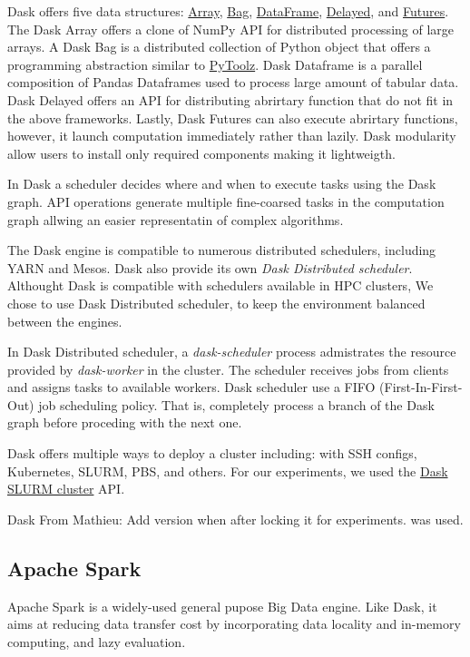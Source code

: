\documentclass[conference]{IEEEtran}
\newcommand{\MD}[1]{\color{magenta}From Mathieu: #1 \color{black}}
\begin{document}
Dask offers five data structures:
\href{https://docs.dask.org/en/latest/array.html}{Array},
\href{https://docs.dask.org/en/latest/bag.html}{Bag},
\href{https://docs.dask.org/en/latest/dataframe.html}{DataFrame},
\href{https://docs.dask.org/en/latest/delayed.html}{Delayed},
and \href{https://docs.dask.org/en/latest/futures.html}{Futures}.
The Dask Array offers a clone of NumPy API for distributed processing of large arrays.
A Dask Bag is a distributed collection of Python object that offers a programming abstraction similar to \href{https://toolz.readthedocs.io/en/latest/}{PyToolz}.
Dask Dataframe is a parallel composition of Pandas Dataframes used to process large amount of tabular data.
Dask Delayed offers an API for distributing abrirtary function that do not fit in the above frameworks.
Lastly, Dask Futures can also execute abrirtary functions, however, it launch computation immediately rather than lazily.
Dask modularity allow users to install only required components making it lightweigth.

In Dask a scheduler decides where and when to execute tasks using the Dask graph.
API operations generate multiple fine-coarsed tasks in the computation graph allwing an easier representatin of complex algorithms.

The Dask engine is compatible to numerous distributed schedulers, including YARN and Mesos.
Dask also provide its own \textit{Dask Distributed scheduler}.
Althought Dask is compatible with schedulers available in HPC clusters,
We chose to use Dask Distributed scheduler, to keep the environment balanced between the engines.

In Dask Distributed scheduler, a \textit{dask-scheduler} process admistrates the resource provided by \textit{dask-worker} in the cluster.
The scheduler receives jobs from clients and assigns tasks to available workers.
Dask scheduler use a FIFO (First-In-First-Out) job scheduling policy.
That is, completely process a branch of the Dask graph before proceding with the next one.

Dask offers multiple ways to deploy a cluster including: with SSH configs, Kubernetes, SLURM, PBS, and others.
For our experiments, we used the \href{https://jobqueue.dask.org/en/latest/generated/dask_jobqueue.SLURMCluster.html}{Dask SLURM cluster} API.

Dask \MD{Add version when after locking it for experiments.} was used.

\subsection{Apache Spark}
Apache Spark is a widely-used general pupose Big Data engine.
Like Dask, it aims at reducing data transfer cost by incorporating data locality and in-memory computing, and lazy evaluation.
\end{document}
